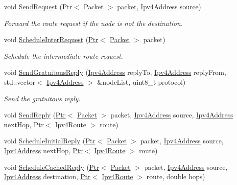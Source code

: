 \begin{DoxyCompactItemize}
void \hyperlink{classns3_1_1dsr_1_1DsrRouting_a21496638c09e75ea310e876135d0bf64}{Send\+Request} (\hyperlink{classns3_1_1Ptr}{Ptr}$<$ \hyperlink{classns3_1_1Packet}{Packet} $>$ packet, \hyperlink{classns3_1_1Ipv4Address}{Ipv4\+Address} source)
\begin{DoxyCompactList}\small\item\em Forward the route request if the node is not the destination. \end{DoxyCompactList}\item 
void \hyperlink{classns3_1_1dsr_1_1DsrRouting_a03175efa8103d392d90298f2d8985a29}{Schedule\+Inter\+Request} (\hyperlink{classns3_1_1Ptr}{Ptr}$<$ \hyperlink{classns3_1_1Packet}{Packet} $>$ packet)
\begin{DoxyCompactList}\small\item\em Schedule the intermediate route request. \end{DoxyCompactList}\item 
void \hyperlink{classns3_1_1dsr_1_1DsrRouting_a780988be538d2a1030d127f1d3c7932c}{Send\+Gratuitous\+Reply} (\hyperlink{classns3_1_1Ipv4Address}{Ipv4\+Address} reply\+To, \hyperlink{classns3_1_1Ipv4Address}{Ipv4\+Address} reply\+From, std\+::vector$<$ \hyperlink{classns3_1_1Ipv4Address}{Ipv4\+Address} $>$ \&node\+List, uint8\+\_\+t protocol)
\begin{DoxyCompactList}\small\item\em Send the gratuitous reply. \end{DoxyCompactList}\item 
void \hyperlink{classns3_1_1dsr_1_1DsrRouting_a69e03d265224fc60bf135b2496d97f04}{Send\+Reply} (\hyperlink{classns3_1_1Ptr}{Ptr}$<$ \hyperlink{classns3_1_1Packet}{Packet} $>$ packet, \hyperlink{classns3_1_1Ipv4Address}{Ipv4\+Address} source, \hyperlink{classns3_1_1Ipv4Address}{Ipv4\+Address} next\+Hop, \hyperlink{classns3_1_1Ptr}{Ptr}$<$ \hyperlink{classns3_1_1Ipv4Route}{Ipv4\+Route} $>$ route)
\item 
void \hyperlink{classns3_1_1dsr_1_1DsrRouting_a9987b38297fb1a4f4e175d5b81853464}{Schedule\+Initial\+Reply} (\hyperlink{classns3_1_1Ptr}{Ptr}$<$ \hyperlink{classns3_1_1Packet}{Packet} $>$ packet, \hyperlink{classns3_1_1Ipv4Address}{Ipv4\+Address} source, \hyperlink{classns3_1_1Ipv4Address}{Ipv4\+Address} next\+Hop, \hyperlink{classns3_1_1Ptr}{Ptr}$<$ \hyperlink{classns3_1_1Ipv4Route}{Ipv4\+Route} $>$ route)
\item 
void \hyperlink{classns3_1_1dsr_1_1DsrRouting_af078d9a9fe5a20264a93f481f6d0feb3}{Schedule\+Cached\+Reply} (\hyperlink{classns3_1_1Ptr}{Ptr}$<$ \hyperlink{classns3_1_1Packet}{Packet} $>$ packet, \hyperlink{classns3_1_1Ipv4Address}{Ipv4\+Address} source, \hyperlink{classns3_1_1Ipv4Address}{Ipv4\+Address} destination, \hyperlink{classns3_1_1Ptr}{Ptr}$<$ \hyperlink{classns3_1_1Ipv4Route}{Ipv4\+Route} $>$ route, double hops)

\end{DoxyCompactItemize}
